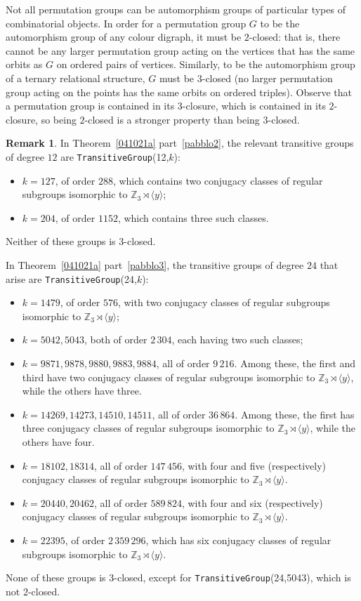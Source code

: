 \documentclass[11pt]{amsart}
\numberwithin{equation}{section}
\theoremstyle{definition}
\newtheorem{remark}[thrm]{Remark}
\def\Z{{\mathbb Z}}
\begin{document}
	Not all permutation groups can be automorphism groups of particular types of combinatorial objects. In order for a permutation group $G$ to be the automorphism group of any colour digraph, it must be $2$-closed: that is, there cannot be any larger permutation group acting on the vertices that has the same orbits as $G$ on ordered pairs of vertices. Similarly, to be the automorphism group of a ternary relational structure, $G$ must be $3$-closed (no larger permutation group acting on the points has the same orbits on ordered triples). Observe that a permutation group is contained in its $3$-closure, which is contained in its $2$-closure, so being $2$-closed is a stronger property than being $3$-closed.
	
	\begin{remark}\label{examples of degree 12}
		In Theorem~\ref{041021a} part~\eqref{pabblo2}, the relevant transitive groups of degree $12$ are \texttt{TransitiveGroup}(12,$k$):
		\begin{itemize}
			\item $k=127$, of order $288$, which contains two conjugacy classes of regular subgroups isomorphic to $\Z_{3}\rtimes\langle y\rangle$;
			\item $k=204$, of order $1152$, which contains three such classes.
		\end{itemize}
		Neither of these groups is $3$-closed.
		
		In Theorem~\ref{041021a} part~\eqref{pabblo3}, the transitive groups of degree $24$ that arise are \texttt{TransitiveGroup}(24,$k$):
		\begin{itemize}
			\item $k=1479$, of order $576$, with two conjugacy classes of regular subgroups isomorphic to $\Z_{3}\rtimes\langle y\rangle$;
			\item $k=5042,5043$, both of order $2\,304$, each having two such classes;
			\item $k=9871,9878,9880,9883,9884$, all of order $9\,216$.  
			Among these, the first and third have two conjugacy classes of regular subgroups isomorphic to $\Z_{3}\rtimes\langle y\rangle$, while the others have three.
			\item $k=14269,14273,14510,14511$, all of order $36\,864$.  Among these, the first has three conjugacy classes of regular subgroups isomorphic to $\Z_{3}\rtimes\langle y\rangle$, while the others have four.
			\item $k=18102, 18314$, all of order $147\,456$, with four and five (respectively) conjugacy classes of regular subgroups isomorphic to $\Z_{3}\rtimes\langle y\rangle$.
			\item $k=20440, 20462$, all of order $589\, 824$, with four and six (respectively) conjugacy classes of regular subgroups isomorphic to $\Z_3\rtimes \langle y\rangle$.
			\item $k=22395$, of order $2\,359\,296$, which has six conjugacy classes of regular subgroups isomorphic to $\Z_3\rtimes \langle y\rangle$.
		\end{itemize}
		None of these groups is $3$-closed, except for \texttt{TransitiveGroup}(24,5043), which is not $2$-closed.
		

\end{remark}
\end{document}
